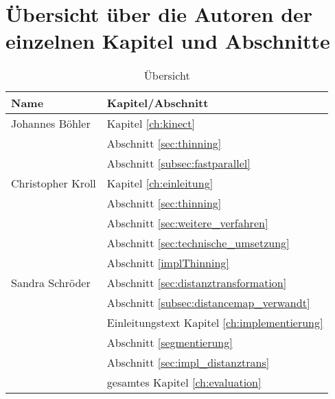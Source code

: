 \chapter{Übersicht über die Autoren der einzelnen Kapitel und Abschnitte}
\begin{table}[htbp]
\begin{center}
\begin{tabular}{|l|l|}
\hline 
\textbf{Name} & \textbf{Kapitel/Abschnitt}\\
\hline Johannes Böhler & Kapitel \ref{ch:kinect}\\
 & Abschnitt \ref{sec:thinning}\\
 & Abschnitt \ref{subsec:fastparallel} \\ 
\hline Christopher Kroll &  Kapitel \ref{ch:einleitung} \\
&  Abschnitt \ref{sec:thinning} \\
&  Abschnitt \ref{sec:weitere_verfahren} \\
&  Abschnitt \ref{sec:technische_umsetzung} \\
&  Abschnitt \ref{implThinning} \\ 
\hline Sandra Schröder &  Abschnitt \ref{sec:distanztransformation}\\
&  Abschnitt \ref{subsec:distancemap_verwandt} \\
& Einleitungstext Kapitel \ref{ch:implementierung}\\
& Abschnitt \ref{segmentierung}\\
& Abschnitt \ref{sec:impl_distanztrans} \\
& gesamtes Kapitel \ref{ch:evaluation} \\
\hline
\end{tabular} 
\end{center}
\caption{Übersicht}
\end{table}
